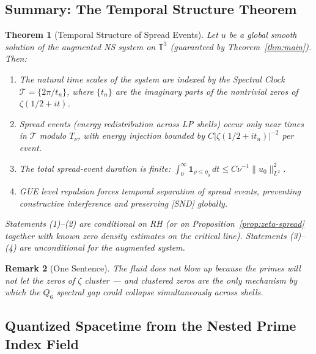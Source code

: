 \documentclass[11pt]{article}
\newtheorem{theorem}{Theorem}[section]
\newtheorem{remark}[theorem]{Remark}
\begin{document}
\subsection{Summary: The Temporal Structure Theorem}

\begin{theorem}[Temporal Structure of Spread Events]\label{thm:temporal}
Let $u$ be a global smooth solution of the augmented NS system on
$\mathbb{T}^3$ (guaranteed by Theorem~\ref{thm:main}).
Then:
\begin{enumerate}
\item The natural time scales of the system are indexed by the Spectral
  Clock $\mathcal{T} = \{2\pi/t_n\}$, where $\{t_n\}$ are the imaginary
  parts of the nontrivial zeros of $\zeta(1/2 + it)$.
\item Spread events (energy redistribution across LP shells) occur only
  near times in $\mathcal{T}$ modulo $T_\nu$, with energy injection
  bounded by $C|\zeta(1/2+it_n)|^{-2}$ per event.
\item The total spread-event duration is finite:
  $\int_0^\infty \mathbf{1}_{\rho \leq \eta_0}\,dt \leq C\nu^{-1}\|u_0\|^2_{L^2}$.
\item GUE level repulsion forces temporal separation of spread events,
  preventing constructive interference and preserving [SND] globally.
\end{enumerate}
Statements (1)--(2) are conditional on RH (or on Proposition~\ref{prop:zeta-spread}
together with known zero density estimates on the critical line).
Statements (3)--(4) are unconditional for the augmented system.
\end{theorem}

\begin{remark}[One Sentence]
The fluid does not blow up because the primes will not let the zeros
of $\zeta$ cluster --- and clustered zeros are the only mechanism by
which the $Q_6$ spectral gap could collapse simultaneously across shells.
\end{remark}

\subsection{Quantized Spacetime from the Nested Prime Index Field}
\label{sec:quantized-st}
\end{document}
